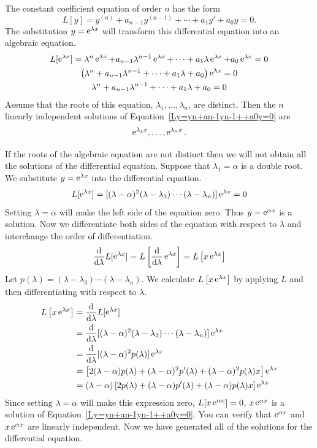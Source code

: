 The constant coefficient equation of order $n$ has the form
\begin{equation}
  \label{Ly=yn+an-1yn-1++a0y=0}
  L[y] = y^{(n)} + a_{n-1} y^{(n-1)} +  \cdots + a_1 y' + a_0 y = 0.
\end{equation}
The substitution $y = \mathop{\mathrm{e}}\nolimits^{\lambda x}$ will transform this 
differential equation into an algebraic equation.
\begin{gather*}
  L[\mathop{\mathrm{e}}\nolimits^{\lambda x} ] = \lambda^n \mathop{\mathrm{e}}\nolimits^{\lambda x} 
  + a_{n-1} \lambda^{n-1} \mathop{\mathrm{e}}\nolimits^{\lambda x} + \cdots 
  + a_1 \lambda \mathop{\mathrm{e}}\nolimits^{\lambda x} + a_0 \mathop{\mathrm{e}}\nolimits^{\lambda x} = 0 \\
  \big(\lambda^n + a_{n-1} \lambda^{n-1} + \cdots + a_1 \lambda + a_0 
  \big) \mathop{\mathrm{e}}\nolimits^{\lambda x} = 0  \\
  \lambda^n + a_{n-1} \lambda^{n-1} + \cdots + a_1 \lambda + a_0 = 0 
\end{gather*}
Assume that the roots of this equation, $\lambda_1, \ldots, \lambda_n$, 
are distinct.  Then the $n$ linearly independent solutions of
Equation~\ref{Ly=yn+an-1yn-1++a0y=0} are
\[ 
\mathop{\mathrm{e}}\nolimits^{\lambda_1 x}, \ldots, \mathop{\mathrm{e}}\nolimits^{\lambda_n x}.
\]


If the roots of the algebraic equation are not distinct then we will not obtain
all the solutions of the differential equation.  Suppose that $\lambda_1 = \alpha$ is a 
double root.  We substitute $y = \mathop{\mathrm{e}}\nolimits^{\lambda x}$ into the differential equation.
\[ 
L[\mathop{\mathrm{e}}\nolimits^{\lambda x}] = [(\lambda-\alpha)^2(\lambda-\lambda_3)\cdots (\lambda-\lambda_n)] \mathop{\mathrm{e}}\nolimits^{\lambda x} = 0
\]
Setting $\lambda = \alpha$ will make the left side
of the equation zero.  Thus $y = \mathop{\mathrm{e}}\nolimits^{\alpha x}$ is a solution.
Now we differentiate both sides of the equation with respect to $\lambda$
and interchange the order of differentiation.
\[
\frac{\mathrm{d}}{\mathrm{d} \lambda} L[\mathop{\mathrm{e}}\nolimits^{\lambda x}] 
= L\left[ \frac{\mathrm{d}}{\mathrm{d} \lambda} \mathop{\mathrm{e}}\nolimits^{\lambda x} \right]
= L \left[ x \mathop{\mathrm{e}}\nolimits^{\lambda x} \right]
\]
Let $p(\lambda) = (\lambda-\lambda_3)\cdots(\lambda-\lambda_n)$.  We calculate $L \left[ x \mathop{\mathrm{e}}\nolimits^{\lambda x} \right]$ by
applying $L$ and then differentiating with respect to $\lambda$.
\begin{align*}
  L \left[ x \mathop{\mathrm{e}}\nolimits^{\lambda x} \right]
  &= \frac{\mathrm{d}}{\mathrm{d} \lambda} L[\mathop{\mathrm{e}}\nolimits^{\lambda x}] \\
  &= \frac{\mathrm{d}}{\mathrm{d} \lambda} [(\lambda-\alpha)^2(\lambda-\lambda_3)\cdots(\lambda-\lambda_n)] \mathop{\mathrm{e}}\nolimits^{\lambda x} \\
  &= \frac{\mathrm{d}}{\mathrm{d} \lambda} [(\lambda-\alpha)^2p(\lambda)] \mathop{\mathrm{e}}\nolimits^{\lambda x} \\
  &= \left[ 2(\lambda-\alpha)p(\lambda) + (\lambda-\alpha)^2 p'(\lambda) + (\lambda-\alpha)^2 p(\lambda) x \right] \mathop{\mathrm{e}}\nolimits^{\lambda x} \\
  &= (\lambda - \alpha) \left[ 2p(\lambda) + (\lambda - \alpha) p'(\lambda) + (\lambda-\alpha)p(\lambda) x \right] \mathop{\mathrm{e}}\nolimits^{\lambda x}
\end{align*}
Since setting $\lambda = \alpha$ will make this expression zero, $L[x \mathop{\mathrm{e}}\nolimits^{\alpha x}] = 0$,
$x \mathop{\mathrm{e}}\nolimits^{\alpha x}$ is a solution of Equation~\ref{Ly=yn+an-1yn-1++a0y=0}.
You can verify that $\mathop{\mathrm{e}}\nolimits^{\alpha x}$ and
$x \mathop{\mathrm{e}}\nolimits^{\alpha x}$ are linearly independent.  Now we have generated all of the
solutions for the differential equation.  

